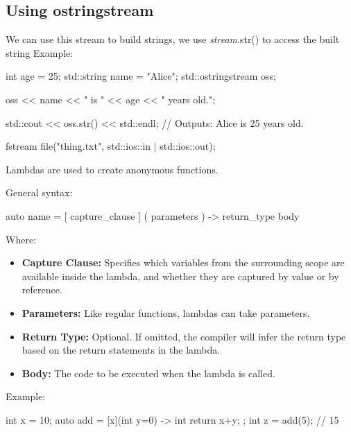 \documentclass{report}
\begin{document}
     \bigbreak \noindent 
     \subsection{Using ostringstream}
     \bigbreak \noindent 
     We can use this stream to build strings, we use \textit{stream}.str() to access the built string
     \bigbreak \noindent 
     Example:
     \bigbreak \noindent 
     
     \begin{cppcode}
int age = 25;
std::string name = "Alice";
std::ostringstream oss;

oss << name << " is " << age << " years old.";

std::cout << oss.str() << std::endl; // Outputs: Alice is 25 years old.
     \end{cppcode}
     

    \pagebreak
    \bigbreak \noindent 
    \begin{cppcode}
fstream file("thing.txt", std::ios::in | std::ios::out);
    \end{cppcode}

    \pagebreak
    \bigbreak \noindent 
    \begin{concept}
       Lambdas are used to create anonymous functions. 
    \end{concept}
    \bigbreak \noindent 
    General syntax:
    \bigbreak \noindent 
    \begin{cppcode}
auto name = [ capture_clause ] ( parameters ) -> return_type { body }
    \end{cppcode}
    \bigbreak \noindent 
    Where:
    \begin{itemize}
        \item \textbf{Capture Clause:} Specifies which variables from the surrounding scope are available inside the lambda, and whether they are captured by value or by reference.
        \item \textbf{Parameters:} Like regular functions, lambdas can take parameters.
        \item \textbf{Return Type:} Optional. If omitted, the compiler will infer the return type based on the return statements in the lambda.
        \item \textbf{Body:} The code to be executed when the lambda is called.
    \end{itemize}

    \bigbreak \noindent 
    Example:
    \bigbreak \noindent 
    \begin{cppcode}
int x = 10;
auto add = [x](int y=0) -> int { return x+y; };
int z  = add(5);  // 15
    \end{cppcode}
    \bigbreak \noindent 
\end{document}
